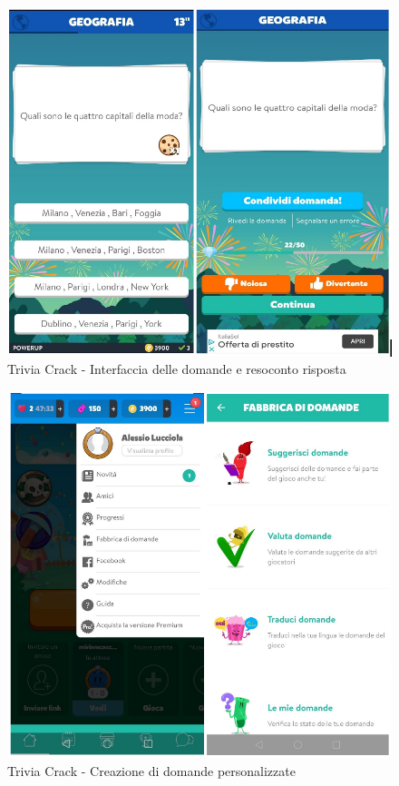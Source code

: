 \documentclass{article}
\begin{document}
\begin{figure}[htp]
\begin{center}
\includegraphics[width=1 \textwidth]{Figure1.png}
\caption{Trivia Crack - Interfaccia delle domande e resoconto risposta}
\end{center}
\end{figure}

\begin{figure}[htp]
\begin{center}
\includegraphics[width=1 \textwidth]{Figure2.png}
\caption{Trivia Crack - Creazione di domande personalizzate}
\end{center}
\end{figure}
\end{document}
